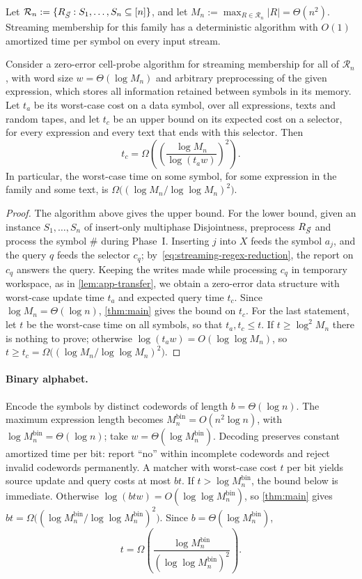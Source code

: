 \begin{theorem}\label{thm:streaming-regex}
Let $\mathcal R_n:=\{R_{\vec{S}}:S_1,\ldots,S_n\subseteq[n]\}$, and let $M_n:=\max_{R\in\mathcal R_n}|R|=\Theta(n^2)$. Streaming membership for this family has a deterministic algorithm with $O(1)$ amortized time per symbol on every input stream.

Consider a zero-error cell-probe algorithm for streaming membership for all of $\mathcal R_n$, with word size $w=\Theta(\log M_n)$ and arbitrary preprocessing of the given expression, which stores all information retained between symbols in its memory. Let $t_a$ be its worst-case cost on a data symbol, over all expressions, texts and random tapes, and let $t_c$ be an upper bound on its expected cost on a selector, for every expression and every text that ends with this selector. Then
\[
t_c=\Omega\!\left(\left(\frac{\log M_n}{\log(t_a w)}\right)^2\right).
\]
In particular, the worst-case time on some symbol, for some expression in the family and some text, is $\Omega\big((\log M_n/\log\log M_n)^2\big)$.
\end{theorem}
\begin{proof}
The algorithm above gives the upper bound. For the lower bound, given an instance $S_1,\dots,S_n$ of insert-only multiphase Disjointness, preprocess $R_{\vec{S}}$ and process the symbol $\#$ during Phase~I. Inserting $j$ into $X$ feeds the symbol $a_j$, and the query $q$ feeds the selector $c_q$; by~\eqref{eq:streaming-regex-reduction}, the report on $c_q$ answers the query. Keeping the writes made while processing $c_q$ in temporary workspace, as in \cref{lem:app-transfer}, we obtain a zero-error data structure with worst-case update time $t_a$ and expected query time $t_c$. Since $\log M_n=\Theta(\log n)$, \cref{thm:main} gives the bound on $t_c$. For the last statement, let $t$ be the worst-case time on all symbols, so that $t_a,t_c\le t$. If $t\ge\log^2 M_n$ there is nothing to prove; otherwise $\log(t_a w)=O(\log\log M_n)$, so $t\ge t_c=\Omega\big((\log M_n/\log\log M_n)^2\big)$.
\end{proof}

\paragraph{Binary alphabet.}
Encode the symbols by distinct codewords of length $b=\Theta(\log n)$. The maximum expression length becomes $M^{\mathrm{bin}}_n=O(n^2\log n)$, with $\log M^{\mathrm{bin}}_n=\Theta(\log n)$; take $w=\Theta(\log M^{\mathrm{bin}}_n)$. Decoding preserves constant amortized time per bit: report ``no'' within incomplete codewords and reject invalid codewords permanently. A matcher with worst-case cost $t$ per bit yields source update and query costs at most $bt$. If $t>\log M^{\mathrm{bin}}_n$, the bound below is immediate. Otherwise $\log(btw)=O(\log\log M^{\mathrm{bin}}_n)$, so \cref{thm:main} gives $bt=\Omega\big((\log M^{\mathrm{bin}}_n/\log\log M^{\mathrm{bin}}_n)^2\big)$. Since $b=\Theta(\log M^{\mathrm{bin}}_n)$,
\[
t=\Omega\!\left(\frac{\log M^{\mathrm{bin}}_n}{(\log\log M^{\mathrm{bin}}_n)^2}\right).
\]

